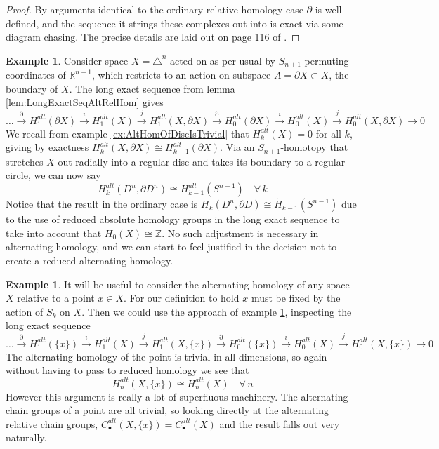 \documentclass[11pt,a4paper,twoside]{article}
\theoremstyle{plain}
\theoremstyle{definition}
\theoremstyle{definition}
\theoremstyle{definition}
\theoremstyle{definition}
\newtheorem{example}[thm]{Example}
\theoremstyle{definition}
\begin{document}
\begin{proof}
By arguments identical to the ordinary relative homology case $\partial$ is well defined, and the sequence it strings these complexes out into is exact via some diagram chasing. The precise details are laid out on page 116 of \cite{algebraictopology}.
\end{proof}

\begin{example}
\label{ex:DiscRelBoundaryIsoSphere}
Consider space $X=\triangle^n$ acted on as per usual by $S_{n\!+\!1}$ permuting coordinates of $\mathbb{R}^{n\!+\!1}$, which restricts to an action on subspace $A=\partial X\subset X$, the boundary of $X$. The long exact sequence from lemma \ref{lem:LongExactSeqAltRelHom} gives
$$\dots\!\overset\partial\rightarrow\! H_1^{alt}(\partial X)\!\overset i\rightarrow\! H_1^{alt}(X)\!\overset j\rightarrow\! H_1^{alt}(X,\partial X)\!\overset\partial\rightarrow\! H_{0}^{alt}(\partial X)\!\overset i\rightarrow\! H_{0}^{alt}(X)\!\overset j\rightarrow\! H_0^{alt}(X,\partial X)\!\rightarrow\!0$$
We recall from example \ref{ex:AltHomOfDiscIsTrivial} that $H_k^{alt}(X)\!=\!0$ for all $k$, giving by exactness $H_k^{alt}(X,\partial X)\cong H_{k\!-\!1}^{alt}(\partial X)$. Via an $S_{n\!+\!1}$-homotopy that stretches $X$ out radially into a regular disc and takes its boundary to a regular circle, we can now say
$$H_k^{alt}(D^n,\partial D^n)\cong H_{k\!-\!1}^{alt}(S^{n\!-\!1})\quad \forall\,k$$
Notice that the result in the ordinary case is $H_{k}(D^n,\partial D)\cong \widetilde{H}_{k\!-\!1}(S^{n\!-\!1})$ due to the use of reduced absolute homology groups in the long exact sequence to take into account that  $H_0(X)\cong\mathbb{Z}$. No such adjustment is necessary in alternating homology, and we can start to feel justified in the decision not to create a reduced alternating homology.
\end{example}

\vspace{1mm}
\begin{example}\label{Ex:AltHomRelPt}
It will be useful to consider the alternating homology of any space $X$ relative to a point $x\in X$. For our definition to hold $x$ must be fixed by the action of $S_k$ on $X$. Then we could use the approach of example \ref{ex:DiscRelBoundaryIsoSphere}, inspecting the long exact sequence
$$\dots\!\overset\partial\rightarrow\! H_1^{alt}(\{x\})\!\overset i\rightarrow\! H_1^{alt}(X)\!\overset j\rightarrow\! H_1^{alt}(X,\{x\})\!\overset\partial\rightarrow\! H_{0}^{alt}(\{x\})\!\overset i\rightarrow\! H_{0}^{alt}(X)\!\overset j\rightarrow\! H_0^{alt}(X,\{x\})\!\longrightarrow\!0$$
The alternating homology of the point is trivial in all dimensions, so again without having to pass to reduced homology we see that 
$$H_n^{alt}(X,\{x\})\cong H_n^{alt}(X)\quad\forall\,n$$
However this argument is really a lot of superfluous machinery. The alternating chain groups of a point are all trivial, so looking directly at the alternating relative chain groups, $C_\bullet^{alt}(X,\{x\})=C_\bullet^{alt}(X)$ and the result falls out very naturally.
\end{example}\vspace{2mm}
\end{document}
